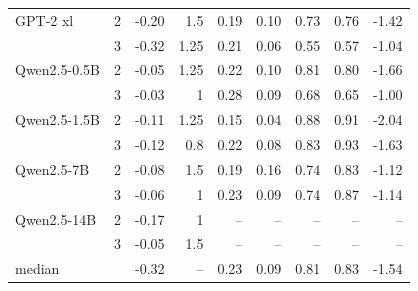 \begin{tabular}{lrrrrrrrr}
GPT-2 xl & 2 & -0.20 & 1.5 & 0.19 & 0.10 & 0.73 & 0.76 & -1.42 \\
 & 3 & -0.32 & 1.25 & 0.21 & 0.06 & 0.55 & 0.57 & -1.04 \\
Qwen2.5-0.5B & 2 & -0.05 & 1.25 & 0.22 & 0.10 & 0.81 & 0.80 & -1.66 \\
 & 3 & -0.03 & 1 & 0.28 & 0.09 & 0.68 & 0.65 & -1.00 \\
Qwen2.5-1.5B & 2 & -0.11 & 1.25 & 0.15 & 0.04 & 0.88 & 0.91 & -2.04 \\
 & 3 & -0.12 & 0.8 & 0.22 & 0.08 & 0.83 & 0.93 & -1.63 \\
Qwen2.5-7B & 2 & -0.08 & 1.5 & 0.19 & 0.16 & 0.74 & 0.83 & -1.12 \\
 & 3 & -0.06 & 1 & 0.23 & 0.09 & 0.74 & 0.87 & -1.14 \\
Qwen2.5-14B & 2 & -0.17 & 1 & -- & -- & -- & -- & -- \\
 & 3 & -0.05 & 1.5 & -- & -- & -- & -- & -- \\
\midrule
median & & -0.32 & -- & 0.23 & 0.09 & 0.81 & 0.83 & -1.54 \\
\bottomrule
\end{tabular}
